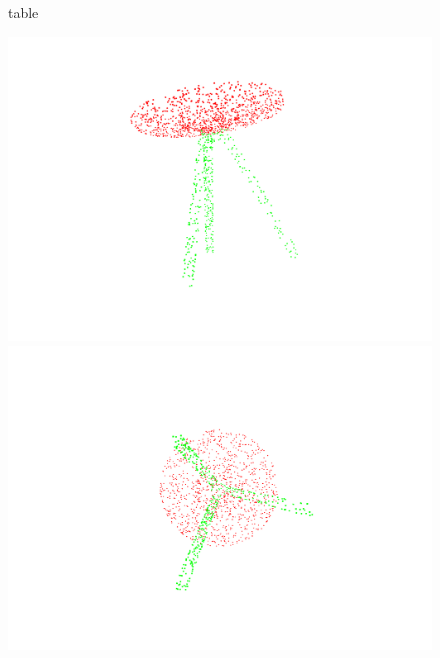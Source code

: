 \begin{figure}[htbp]
    \begin{minipage}{0.1\textwidth}
        \centering
        {table}
    \end{minipage}
    \hfill
    \begin{minipage}{0.25\textwidth}
        \centering
        \includegraphics[width=\textwidth]{fig/supplement/part_segmentation/table/table00.pdf}
    \end{minipage}
    \hfill
    \begin{minipage}{0.25\textwidth}
        \centering
        \includegraphics[width=\textwidth]{fig/supplement/part_segmentation/table/table01.pdf}
    \end{minipage}
    \hfill
    \begin{minipage}{0.25\textwidth}

\end{minipage}
\end{figure}
